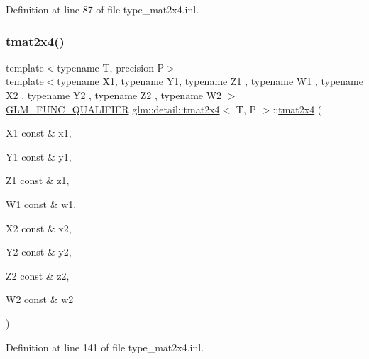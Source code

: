 Definition at line 87 of file type\+\_\+mat2x4.\+inl.

\mbox{\label{structglm_1_1detail_1_1tmat2x4_ad19123b26d51d5e015a0667d9dea5ae9}} 
\subsubsection{\texorpdfstring{tmat2x4()}{tmat2x4()}\hspace{0.1cm}{\footnotesize\ttfamily [20/22]}}
{\footnotesize\ttfamily template$<$typename T, precision P$>$ \\
template$<$typename X1, typename Y1, typename Z1 , typename W1 , typename X2 , typename Y2 , typename Z2 , typename W2 $>$ \\
\hyperlink{setup_8hpp_a33fdea6f91c5f834105f7415e2a64407}{G\+L\+M\+\_\+\+F\+U\+N\+C\+\_\+\+Q\+U\+A\+L\+I\+F\+I\+ER} \hyperlink{structglm_1_1detail_1_1tmat2x4}{glm\+::detail\+::tmat2x4}$<$ T, P $>$\+::\hyperlink{structglm_1_1detail_1_1tmat2x4}{tmat2x4} (\begin{DoxyParamCaption}\item[{X1 const \&}]{x1,  }\item[{Y1 const \&}]{y1,  }\item[{Z1 const \&}]{z1,  }\item[{W1 const \&}]{w1,  }\item[{X2 const \&}]{x2,  }\item[{Y2 const \&}]{y2,  }\item[{Z2 const \&}]{z2,  }\item[{W2 const \&}]{w2 }\end{DoxyParamCaption})}



Definition at line 141 of file type\+\_\+mat2x4.\+inl.

\mbox{\label{structglm_1_1detail_1_1tmat2x4_a153edc0a905dc1128b78120c22a27b02}} 
